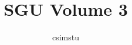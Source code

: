 \documentclass[a4paper]{article}
\begin{document}
\title{SGU Volume 3}
\author{csimstu}
\maketitle
\tableofcontents

































\end{document}

